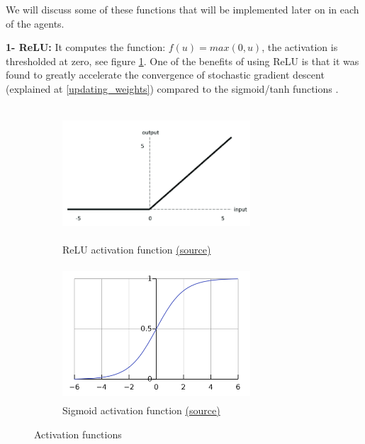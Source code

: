 We will discuss some of these functions that will be implemented later on in each of the agents. \newline

\textbf{1- ReLU: }It computes the function: $f(u)=max(0,u)$, the activation is thresholded at zero, see figure \ref{ReLU activation function}. One of the benefits of using ReLU is that it was found to greatly accelerate the convergence of stochastic gradient descent (explained at \ref{updating_weights}) compared to the sigmoid/tanh functions \cite{relu_cite}.\newline


\begin{figure}
    \begin{subfigure}[b]{0.5\textwidth}
        \includegraphics[width=7cm,height=5cm]{images/relu.png}
        \caption{ReLU activation function \href{https://www.researchgate.net/figure/ReLU-activation-function_fig7_333411007}{(\underline{source})}}
        \label{ReLU activation function}
    \end{subfigure}
    \hfill
    \begin{subfigure}[b]{0.5\textwidth}
        \includegraphics[width=7cm,height=5cm]{images/sigmoid.png}
        \caption{Sigmoid activation function \href{https://en.wikipedia.org/wiki/Sigmoid_function}{(\underline{source})}}
        \label{sigmoid_figure}
    \end{subfigure}
    \caption{Activation functions}
    \label{fig:activation functions}
\end{figure}

